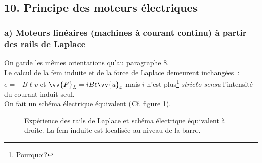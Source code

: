 \documentclass{article}
\renewcommand\overrightarrow{\vv}
\begin{document}
\subsection*{10. Principe des moteurs électriques}
\subsubsection*{a) Moteurs linéaires (machines à courant continu) à partir des rails de Laplace}
On garde les mêmes
orientations qu'au paragraphe 8. \\
Le calcul de la fem induite et de la force de Laplace demeurent
inchangées : $e = -B\ell v$ et $\overrightarrow{F}_{L} = iB\ell
\overrightarrow{u}_{x}$ mais $i$ n'est plus\footnote{Pourquoi?} \textit{stricto sensu} l'intensité du courant induit seul. \\
On fait un schéma électrique équivalent (Cf. figure \ref{Fig.5}).

\begin{figure}[h]
\begin{center}
\end{center}
\caption{Expérience des rails de Laplace et schéma électrique
équivalent à droite. La fem induite est localisée au niveau de la
barre.}\label{Fig.5}
\end{figure}
\end{document}
